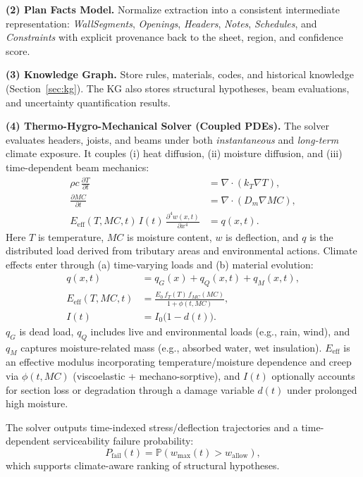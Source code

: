 \textbf{(2) Plan Facts Model.}
Normalize extraction into a consistent intermediate representation:
\emph{WallSegments}, \emph{Openings}, \emph{Headers}, \emph{Notes}, \emph{Schedules}, and \emph{Constraints}
with explicit provenance back to the sheet, region, and confidence score.

\textbf{(3) Knowledge Graph.}
Store rules, materials, codes, and historical knowledge (Section~\ref{sec:kg}).
The KG also stores structural hypotheses, beam evaluations, and uncertainty quantification results.

\textbf{(4) Thermo-Hygro-Mechanical Solver (Coupled PDEs).}
The solver evaluates headers, joists, and beams under both \emph{instantaneous} and \emph{long-term} climate exposure.
It couples (i) heat diffusion, (ii) moisture diffusion, and (iii) time-dependent beam mechanics:
\begin{align}
\rho c \, \frac{\partial T}{\partial t} &= \nabla \cdot (k_T \nabla T), \label{eq:heat}\\
\frac{\partial MC}{\partial t} &= \nabla \cdot (D_m \nabla MC), \label{eq:moisture}\\
E_{\mathrm{eff}}(T,MC,t)\, I(t)\, \frac{\partial^4 w(x,t)}{\partial x^4} &= q(x,t). \label{eq:beam_time}
\end{align}
Here $T$ is temperature, $MC$ is moisture content, $w$ is deflection, and $q$ is the distributed load derived from tributary areas and environmental actions.
Climate effects enter through (a) time-varying loads and (b) material evolution:
\begin{align}
q(x,t) &= q_G(x) + q_Q(x,t) + q_M(x,t), \label{eq:q_time}\\
E_{\mathrm{eff}}(T,MC,t) &= \frac{E_0\, f_T(T)\, f_{MC}(MC)}{1+\phi(t,MC)}, \label{eq:Eeff}\\
I(t) &= I_0 \big(1-d(t)\big). \label{eq:It}
\end{align}
$q_G$ is dead load, $q_Q$ includes live and environmental loads (e.g., rain, wind), and $q_M$ captures moisture-related mass (e.g., absorbed water, wet insulation).
$E_{\mathrm{eff}}$ is an effective modulus incorporating temperature/moisture dependence and creep via $\phi(t,MC)$ (viscoelastic + mechano-sorptive),
and $I(t)$ optionally accounts for section loss or degradation through a damage variable $d(t)$ under prolonged high moisture.

The solver outputs time-indexed stress/deflection trajectories and a time-dependent serviceability failure probability:
\begin{equation}
P_{\mathrm{fail}}(t) = \mathbb{P}\!\left(w_{\max}(t) > w_{\mathrm{allow}}\right),
\label{eq:Pfail_t}
\end{equation}
which supports climate-aware ranking of structural hypotheses.

